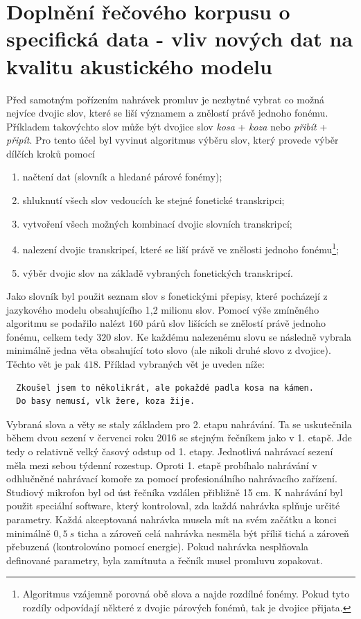 \section{Doplnění řečového korpusu o specifická data - vliv nových dat na kvalitu akustického modelu}
\label{chap:realisation:corpus}

Před samotným pořízením nahrávek promluv je nezbytné vybrat co možná nejvíce dvojic slov, které se liší významem a znělostí právě jednoho fonému.
Příkladem takovýchto slov může být dvojice slov \textit{kosa} + \textit{koza} nebo \textit{přibít} + \textit{připít}.
Pro tento účel byl vyvinut algoritmus výběru slov, který provede výběr dílčích kroků pomocí

\begin{enumerate}
  \item načtení dat (slovník a hledané párové fonémy);
  \item shluknutí všech slov vedoucích ke stejné fonetické transkripci;
  \item vytvoření všech možných kombinací dvojic slovních transkripcí;
  \item nalezení dvojic transkripcí, které se liší právě ve znělosti jednoho fonému\footnote{Algoritmus vzájemně porovná obě slova a najde rozdílné fonémy. Pokud tyto rozdíly odpovídají některé z dvojic párových fonémů, tak je dvojice přijata.};
  \item výběr dvojic slov na základě vybraných fonetických transkripcí.
\end{enumerate}

\noindent Jako slovník byl použit seznam slov s fonetickými přepisy, které pocházejí z jazykového modelu obsahujícího 1,2 milionu slov.
Pomocí výše zmíněného algoritmu se podařilo nalézt $160$ párů slov lišících se znělostí právě jednoho fonému, celkem tedy $320$ slov.
Ke každému nalezenému slovu se následně vybrala minimálně jedna věta obsahující toto slovo (ale nikoli druhé slovo z dvojice).
Těchto vět je pak $418$. Příklad vybraných vět je uveden níže:

\begin{verbatim}
  Zkoušel jsem to několikrát, ale pokaždé padla kosa na kámen.
  Do basy nemusí, vlk žere, koza žije.
\end{verbatim}

Vybraná slova a věty se staly základem pro 2. etapu nahrávání.
Ta se uskutečnila během dvou sezení v červenci roku 2016 se stejným řečníkem jako v 1. etapě.
Jde tedy o relativně velký časový odstup od 1. etapy.
Jednotlivá nahrávací sezení měla mezi sebou týdenní rozestup.
Oproti 1. etapě probíhalo nahrávání v odhlučněné nahrávací komoře za pomocí profesionálního nahrávacího zařízení.
Studiový mikrofon byl od úst řečníka vzdálen přibližně 15 cm.
K nahrávání byl použit speciální software, který kontroloval, zda každá nahrávka splňuje určité parametry.
Každá akceptovaná nahrávka musela mít na svém začátku a konci minimálně $0,5\ s$ ticha a zároveň celá nahrávka nesměla být příliš tichá a zároveň přebuzená (kontrolováno pomocí energie).
Pokud nahrávka nesplňovala definované parametry, byla zamítnuta a řečník musel promluvu zopakovat.

